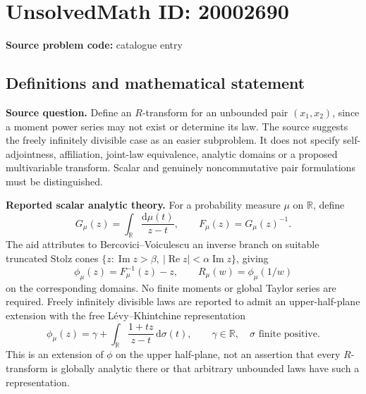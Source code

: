 \documentclass[11pt]{article}
\newcommand{\R}{\mathbb{R}}
\begin{document}
\section*{UnsolvedMath ID: 20002690}
\textbf{Source problem code:} catalogue entry
\subsection{Definitions and mathematical statement}
\textbf{Source question.} Define an \(R\)-transform for an unbounded pair \((x_1,x_2)\), since a moment power series may not exist or determine its law. The source suggests the freely infinitely divisible case as an easier subproblem. It does not specify self-adjointness, affiliation, joint-law equivalence, analytic domains or a proposed multivariable transform. Scalar and genuinely noncommutative pair formulations must be distinguished.

\textbf{Reported scalar analytic theory.} For a probability measure \(\mu\) on \(\R\), define
\[
 G_\mu(z)=\int_\R\frac{\mathrm d\mu(t)}{z-t},\qquad
 F_\mu(z)=G_\mu(z)^{-1}.
\]
The aid attributes to Bercovici--Voiculescu an inverse branch on suitable truncated Stolz cones \(\{z:\operatorname{Im}z>\beta,\ |\operatorname{Re}z|<\alpha\operatorname{Im}z\}\), giving
\[
 \phi_\mu(z)=F_\mu^{-1}(z)-z,\qquad R_\mu(w)=\phi_\mu(1/w)
\]
on the corresponding domains. No finite moments or global Taylor series are required. Freely infinitely divisible laws are reported to admit an upper-half-plane extension with the free L\'evy--Khintchine representation
\[
 \phi_\mu(z)=\gamma+\int_\R\frac{1+tz}{z-t}\,\mathrm d\sigma(t),
 \qquad\gamma\in\R,\quad\sigma\text{ finite positive}.
\]
This is an extension of \(\phi\) on the upper half-plane, not an assertion that every \(R\)-transform is globally analytic there or that arbitrary unbounded laws have such a representation.
\end{document}
